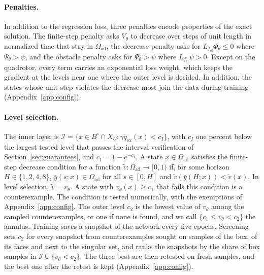 \documentclass{l4dc2027}
\newcommand{\Oad}{\Omega_{\mathrm{ad}}}
\newcommand{\I}{\mathcal I}
\newcommand{\qex}{q_{\mathrm{ex}}}
\begin{document}
\vspace{-0.075in}

\paragraph{Penalties.}  In addition to the regression loss, three penalties encode properties of the exact solution. The finite-step penalty asks $V_\theta$ to decrease over steps of unit length in normalized time that stay in $\Oad$, the decrease penalty asks for $L_{f_{\mathrm{cl}}}\Phi_\theta\le0$ where $\Psi_\theta>\psi$, and the obstacle penalty asks for $\Psi_\theta>\psi$ where $L_{f_{\mathrm{cl}}}\psi>0$. Except on the quadrotor, every term carries an exponential loss weight, which keeps the gradient at the levels near one where the outer level is decided. In addition, the states whose unit step violates the decrease most join the data during training (Appendix~\ref{app:config}).

\vspace{-0.075in}

\paragraph{Level selection.} The inner layer is $\I=\{x\in B^\circ\cap X_U:\gamma\qex(x)<c_I\}$, with $c_I$ one percent below the largest tested level that passes the interval verification of Section~\ref{sec:guarantees}, and $c_1=1-e^{-c_I}$. A state $x\in\Oad$ satisfies the finite-step decrease condition for a function $\tilde v:\Oad\to[0,1)$ if, for some horizon $H\in\{1,2,4,8\}$, $\bar y(s;x)\in\Oad$ for all $s\in[0,H]$ and $\tilde v(\bar y(H;x))<\tilde v(x)$. In level selection, $\tilde v=v_\theta$. A state with $v_\theta(x)\ge c_1$ that fails this condition is a counterexample. The condition is tested numerically, with the exemptions of Appendix~\ref{app:config}. The outer level $c_2$ is the lowest value of $v_\theta$ among the sampled counterexamples, or one if none is found, and we call $\{c_1\le v_\theta<c_2\}$ the annulus. Training saves a snapshot of the network every five epochs. Screening sets $c_2$ for every snapshot from counterexamples sought on samples of the box, of its faces and next to the singular set, and ranks the snapshots by the share of box samples in $\I\cup\{v_\theta<c_2\}$. The three best are then retested on fresh samples, and the best one after the retest is kept (Appendix~\ref{app:config}).

\vspace{-0.075in}
\end{document}
